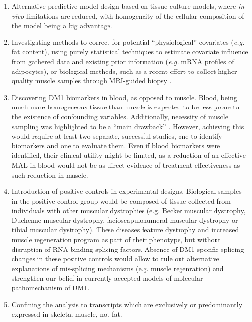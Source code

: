 \documentclass[10pt,letterpaper]{article}
\begin{document}
\begin{enumerate}
\item Alternative predictive model design based on tissue culture models, where {\it in vivo} limitations are reduced, with homogeneity of the cellular composition of the model being a big advantage.
\item Investigating methods to correct for potential ``physiological'' covariates ({\it e.g.} fat content), using purely statistical techniques to estimate covariate influence from gathered data and existing prior information ({\it e.g.} mRNA profiles of adipocytes), or biological methods, such as a recent effort to collect higher quality muscle samples through MRI-guided biopsy \cite{Saskie2018}.
\item Discovering DM1 biomarkers in blood, as opposed to muscle. Blood, being much more homogeneous tissue than muscle is expected to be less prone to the existence of confounding variables. Additionally, necessity of muscle sampling was highlighted to be a ``main drawback'' \cite{Nakamori2013}. However, achieving this would require at least two separate, successful studies, one to identify biomarkers and one to evaluate them. Even if blood biomarkers were identified, their clinical utility might be limited, as a reduction of an effective MAL in blood would not be as direct evidence of treatment effectiveness as such reduction in muscle.
\item Introduction of positive controls in experimental designs. Biological samples in the positive control group would be composed of tissue collected from individuals with other muscular dystrophies (e.g. Becker muscular dystrophy, Duchenne muscular dystrophy, facioscapulohumeral muscular dystrophy or tibial muscular dystrophy). These diseases feature dystrophy and increased muscle regeneration program as part of their phenotype, but without disruption of RNA-binding splicing factors. Absence of DM1-specific splicing changes in these positive controls would allow to rule out alternative explanations of mis-splicing mechanisms (e.g. muscle regenration) and strengthen our belief in currently accepted models of molecular pathomechanism of DM1.
\item Confining the analysis to transcripts which are exclusively or predominantly expressed in skeletal muscle, not fat.
\end{enumerate}
\end{document}
